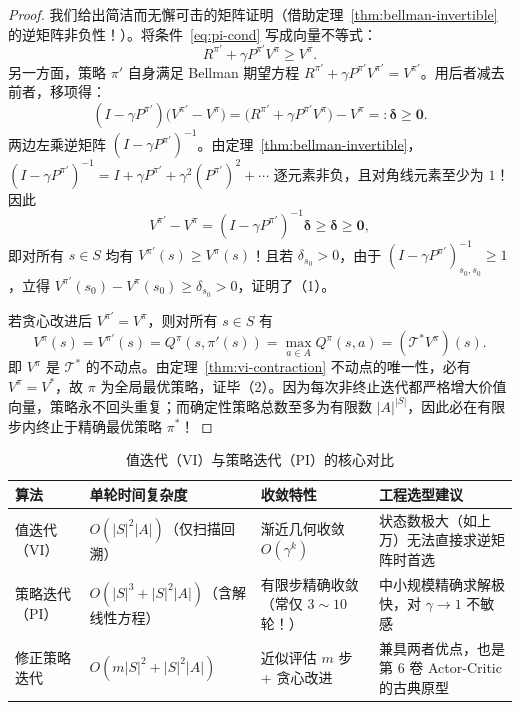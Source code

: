 \begin{proof}
我们给出简洁而无懈可击的矩阵证明（借助定理~\ref{thm:bellman-invertible} 的逆矩阵非负性！）。将条件~\eqref{eq:pi-cond} 写成向量不等式：
\[
  R^{\pi'} + \gamma P^{\pi'} V^\pi \ge V^\pi.
\]
另一方面，策略 $\pi'$ 自身满足 Bellman 期望方程 $R^{\pi'} + \gamma P^{\pi'} V^{\pi'} = V^{\pi'}$。用后者减去前者，移项得：
\[
  (I - \gamma P^{\pi'})\big(V^{\pi'} - V^\pi\big)
  = \big(R^{\pi'} + \gamma P^{\pi'} V^\pi\big) - V^\pi
  =: \boldsymbol{\delta} \ge \mathbf{0}.
\]
两边左乘逆矩阵 $(I - \gamma P^{\pi'})^{-1}$。由定理~\ref{thm:bellman-invertible}，$(I - \gamma P^{\pi'})^{-1} = I + \gamma P^{\pi'} + \gamma^2 (P^{\pi'})^2 + \cdots$ 逐元素非负，且对角线元素至少为 $1$！因此
\[
  V^{\pi'} - V^\pi = (I - \gamma P^{\pi'})^{-1} \boldsymbol{\delta} \ge \boldsymbol{\delta} \ge \mathbf{0},
\]
即对所有 $s \in S$ 均有 $V^{\pi'}(s) \ge V^\pi(s)$！且若 $\delta_{s_0} > 0$，由于 $(I - \gamma P^{\pi'})^{-1}_{s_0, s_0} \ge 1$，立得 $V^{\pi'}(s_0) - V^\pi(s_0) \ge \delta_{s_0} > 0$，证明了（1）。

若贪心改进后 $V^{\pi'} = V^\pi$，则对所有 $s \in S$ 有
\[
  V^\pi(s) = V^{\pi'}(s) = Q^\pi(s, \pi'(s)) = \max_{a \in A} Q^\pi(s, a) = (\mathcal{T}^* V^\pi)(s).
\]
即 $V^\pi$ 是 $\mathcal{T}^*$ 的不动点。由定理~\ref{thm:vi-contraction} 不动点的唯一性，必有 $V^\pi = V^*$，故 $\pi$ 为全局最优策略，证毕（2）。因为每次非终止迭代都严格增大价值向量，策略永不回头重复；而确定性策略总数至多为有限数 $|A|^{|S|}$，因此必在有限步内终止于精确最优策略 $\pi^*$！
\end{proof}

\begin{table}[htbp]
\centering
\caption{值迭代（VI）与策略迭代（PI）的核心对比}
\label{tab:vi-vs-pi}
\small
\begin{tabularx}{\linewidth}{@{}p{26mm}p{35mm}p{35mm}X@{}}
\toprule
\textbf{算法} & \textbf{单轮时间复杂度} & \textbf{收敛特性} & \textbf{工程选型建议} \\
\midrule
值迭代（VI） & $O(|S|^2 |A|)$（仅扫描回溯） & 渐近几何收敛 $O(\gamma^k)$ & 状态数极大（如上万）无法直接求逆矩阵时首选 \\
策略迭代（PI） & $O(|S|^3 + |S|^2 |A|)$（含解线性方程） & 有限步精确收敛（常仅 $3\sim 10$ 轮！） & 中小规模精确求解极快，对 $\gamma \to 1$ 不敏感 \\
修正策略迭代 & $O(m |S|^2 + |S|^2 |A|)$ & 近似评估 $m$ 步 + 贪心改进 & 兼具两者优点，也是第 6 卷 Actor-Critic 的古典原型 \\
\bottomrule
\end{tabularx}
\end{table}

